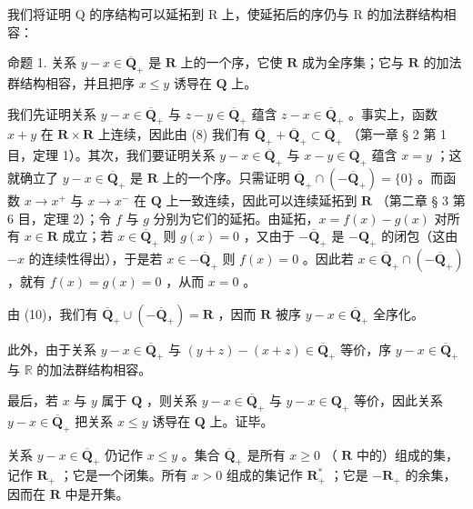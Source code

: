 我们将证明 Q 的序结构可以延拓到 R 上，使延拓后的序仍与 R 的加法群结构相容：

命题 1. 关系 \(y - x \in \overline{\mathbf{Q}}_+\) 是 \(\mathbf{R}\) 上的一个序，它使 \(\mathbf{R}\) 成为全序集；它与 \(\mathbf{R}\) 的加法群结构相容，并且把序 \(x \leqslant y\) 诱导在 \(\mathbf{Q}\) 上。

我们先证明关系 \(y - x \in \overline{\mathbf{Q}}_+\) 与 \(z - y \in \overline{\mathbf{Q}}_+\) 蕴含 \(z - x \in \overline{\mathbf{Q}}_+\) 。事实上，函数 \(x + y\) 在 \(\mathbf{R} \times \mathbf{R}\) 上连续，因此由 (8) 我们有 \(\overline{\mathbf{Q}}_+ + \overline{\mathbf{Q}}_+ \subset \overline{\mathbf{Q}}_+\) （第一章 § 2 第 1 目，定理 1）。其次，我们要证明关系 \(y - x \in \overline{\mathbf{Q}}_+\) 与 \(x - y \in \overline{\mathbf{Q}}_+\) 蕴含 \(x = y\) ；这就确立了 \(y - x \in \overline{\mathbf{Q}}_+\) 是 \(\mathbf{R}\) 上的一个序。只需证明 \(\overline{\mathbf{Q}}_+ \cap (-\overline{\mathbf{Q}}_+) = \{0\}\) 。而函数 \(x \to x^+\) 与 \(x \to x^-\) 在 \(\mathbf{Q}\) 上一致连续，因此可以连续延拓到 \(\mathbf{R}\) （第二章 § 3 第 6 目，定理 2）；令 \(f\) 与 \(g\) 分别为它们的延拓。由延拓，\(x = f(x) - g(x)\) 对所有 \(x \in \mathbf{R}\) 成立；若 \(x \in \overline{\mathbf{Q}}_+\) 则 \(g(x) = 0\) ，又由于 \(-\overline{\mathbf{Q}}_+\) 是 \(-\mathbf{Q}_+\) 的闭包（这由 \(-x\) 的连续性得出），于是若 \(x \in -\overline{\mathbf{Q}}_+\) 则 \(f(x) = 0\) 。因此若 \(x \in \overline{\mathbf{Q}}_+ \cap (-\overline{\mathbf{Q}}_+)\) ，就有 \(f(x) = g(x) = 0\) ，从而 \(x = 0\) 。

由 (10)，我们有 \(\overline{\mathbf{Q}}_{+} \cup (-\overline{\mathbf{Q}}_{+}) = \mathbf{R}\) ，因而 \(\mathbf{R}\) 被序 \(y - x \in \overline{\mathbf{Q}}_{+}\) 全序化。

此外，由于关系 \(y - x \in \overline{\mathbf{Q}}_+\) 与 \((y + z) - (x + z) \in \overline{\mathbf{Q}}_+\) 等价，序 \(y - x \in \overline{\mathbf{Q}}_+\) 与 \(\mathbb{R}\) 的加法群结构相容。

最后，若 \(x\) 与 \(y\) 属于 \(\mathbf{Q}\) ，则关系 \(y - x \in \overline{\mathbf{Q}}_+\) 与 \(y - x \in \mathbf{Q}_+\) 等价，因此关系 \(y - x \in \overline{\mathbf{Q}}_+\) 把关系 \(x \leqslant y\) 诱导在 \(\mathbf{Q}\) 上。证毕。

关系 \(y - x \in \overline{\mathbf{Q}}_+\) 仍记作 \(x \leqslant y\) 。集合 \(\overline{\mathbf{Q}}_+\) 是所有 \(x \geqslant 0\) （ \(\mathbf{R}\) 中的）组成的集，记作 \(\mathbf{R}_+\) ；它是一个闭集。所有 \(x > 0\) 组成的集记作 \(\mathbf{R}_+^*\) ；它是 \(-\mathbf{R}_+\) 的余集，因而在 \(\mathbf{R}\) 中是开集。


